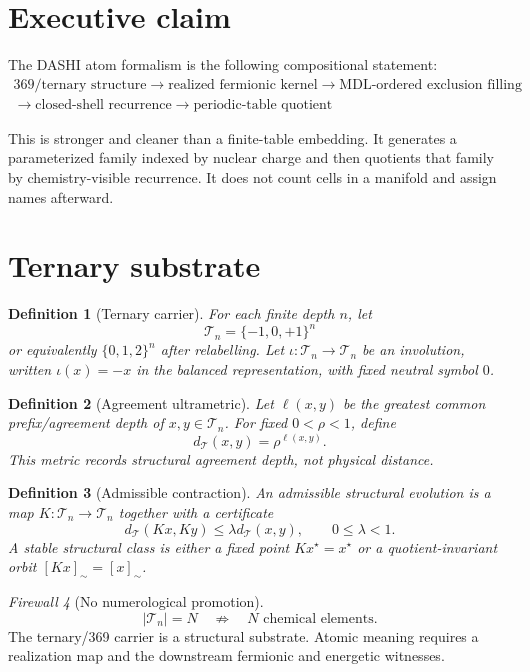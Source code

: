 \documentclass[11pt,a4paper]{article}
\newtheorem{definition}{Definition}[section]
\theoremstyle{remark}
\newtheorem{firewall}[definition]{Firewall}
\newcommand{\T}{\mathcal T}
\begin{document}
\section{Executive claim}

The DASHI atom formalism is the following compositional statement:
\[
\boxed{\begin{gathered}
\text{369/ternary structure}\to\text{realized fermionic kernel}\to\text{MDL-ordered exclusion filling}\\
\to\text{closed-shell recurrence}\to\text{periodic-table quotient}
\end{gathered}}
\]

This is stronger and cleaner than a finite-table embedding.  It generates a
parameterized family indexed by nuclear charge and then quotients that family by
chemistry-visible recurrence.  It does not count cells in a manifold and assign
names afterward.

\section{Ternary substrate}

\begin{definition}[Ternary carrier]
For each finite depth $n$, let
\[
\T_n = \{-1,0,+1\}^n
\]
or equivalently $\{0,1,2\}^n$ after relabelling.  Let $\iota:\T_n\to\T_n$ be
an involution, written $\iota(x)=-x$ in the balanced representation, with fixed
neutral symbol $0$.
\end{definition}

\begin{definition}[Agreement ultrametric]
Let $\ell(x,y)$ be the greatest common prefix/agreement depth of $x,y\in\T_n$.
For fixed $0<\rho<1$, define
\[
 d_{\T}(x,y)=\rho^{\ell(x,y)}.
\]
This metric records structural agreement depth, not physical distance.
\end{definition}

\begin{definition}[Admissible contraction]
An admissible structural evolution is a map $K:\T_n\to\T_n$ together with a
certificate
\[
 d_{\T}(Kx,Ky)\le \lambda d_{\T}(x,y),\qquad 0\le \lambda<1.
\]
A stable structural class is either a fixed point $Kx^\star=x^\star$ or a
quotient-invariant orbit $[Kx]_{\sim}=[x]_{\sim}$.
\end{definition}

\begin{firewall}[No numerological promotion]
\[
 |\T_n|=N \quad\not\Rightarrow\quad N\text{ chemical elements}.
\]
The ternary/369 carrier is a structural substrate.  Atomic meaning requires a
realization map and the downstream fermionic and energetic witnesses.
\end{firewall}
\end{document}
